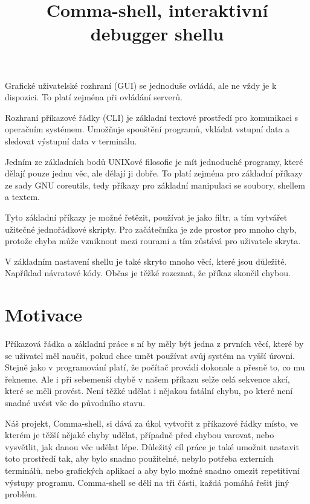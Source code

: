 \documentclass[thesis=M,czech]{FITthesis}[2012/06/26]
\title{Comma-shell, interaktivní debugger shellu}
\begin{document}
\lstset{basicstyle=\footnotesize\ttfamily,breaklines=true,showstringspaces=false,captionpos=b}
\renewcommand{\lstlistingname}{Ukázka}




\begin{introduction}


Grafické uživatelské rozhraní (GUI) se jednoduše ovládá, ale ne vždy je k dispozici. To platí zejména při ovládání serverů.

Rozhraní příkazové řádky (CLI) je základní textové prostředí pro komunikaci s operačním systémem. Umožňuje spouštění programů, vkládat vstupní data a sledovat výstupní data v terminálu.

Jedním ze základních bodů UNIXové filosofie je mít jednoduché programy, které dělají pouze jednu věc, ale dělají ji dobře. To platí zejména pro základní příkazy ze sady GNU coreutils, tedy příkazy pro základní manipulaci se soubory, shellem a textem.

Tyto základní příkazy je možné řetězit, používat je jako filtr, a tím vytvářet užitečné jednořádkové skripty. Pro začátečníka je zde prostor pro mnoho chyb, protože chyba může vzniknout mezi rourami a tím zůstává pro uživatele skryta.

V základním nastavení shellu je také skryto mnoho věcí, které jsou důležité. Například návratové kódy. Občas je těžké rozeznat, že příkaz skončil chybou.


\section{Motivace}

Příkazová řádka a základní práce s ní by měly být jedna z prvních věcí, které by se uživatel měl naučit, pokud chce umět používat svůj systém na vyšší úrovni. Stejně jako v programování platí, že počítač provádí dokonale a přesně to, co mu řekneme. Ale i při sebemenší chybě v našem příkazu selže celá sekvence akcí, které se měli provést. Není těžké udělat i nějakou fatální chybu, po které není snadné uvést vše do původního stavu.

Náš projekt, Comma-shell, si dává za úkol vytvořit z příkazové řádky místo, ve kterém je těžší nějaké chyby udělat, případně před chybou varovat, nebo vysvětlit, jak danou věc udělat lépe. Důležitý cíl práce je také umožnit nastavit toto prostředí tak, aby bylo snadno použitelné, nebylo potřeba externích terminálů, nebo grafických aplikací a aby bylo možné snadno omezit repetitivní výstupy programu. Comma-shell se dělí na tři části, každá pomáhá řešit jiný problém.


\end{introduction}
\end{document}
